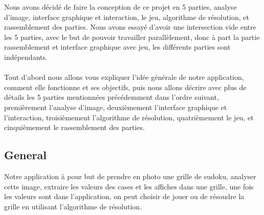 \documentclass{article}
\begin{document}
Nous avons décidé de faire la conception de ce projet en 5 parties, analyse d'image, interface graphique et interaction, le jeu, algorithme de résolution, et rassemblement des parties. Nous avons essayé d'avoir une intersection vide entre les 5 parties, avec le but de pouvoir travailler parallèlement, donc à part la partie rassemblement et interface graphique avec jeu, les différents parties sont indépendants. 
\\
\\
Tout d'abord nous allons vous expliquer l'idée générale de notre application, comment elle fonctionne et ses objectifs, puis nous allons décrire avec plus de détails les 5 parties mentionnées précédemment dans l'ordre suivant, premièrement l'analyse d'image, deuxièmement l'interface graphique et l'interaction, troisièmement l'algorithme de résolution, quatrièmement le jeu, et cinquièmement le rassemblement des parties.




\subsection{General}

Notre application à pour but de prendre en photo une grille de sudoku, analyser cette image, extraire les valeurs des cases et les affiches dans une grille, une fois les valeurs sont dans l’application, on peut choisir de jouer ou de résoudre la grille en utilisant l’algorithme de résolution. 



\\
\end{document}
